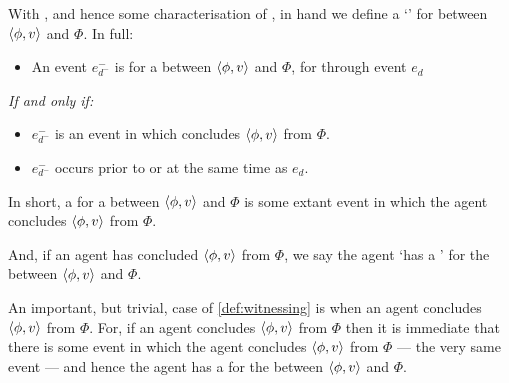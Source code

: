 \begin{note}
  With \supportI{}, and hence some characterisation of \ros{}, in hand we define a `' for \ros{} between \(\langle \phi, v \rangle\) and \(\Phi\).
  In full:

  \begin{definition}%
    \label{def:witnessing}%
    \vspace{-\baselineskip}
    \begin{itemize}
    \item
      An event \(e^{-}_{d^{-}}\) is \emph{} for a \ros{} between \(\langle \phi, v \rangle\) and \(\Phi\), for \vAgent{} through event \(e_{d}\)
    \end{itemize}

    \emph{If and only if:}

    \begin{itemize}
    \item
      \(e^{-}_{d^{-}}\) is an event in which \vAgent{} concludes \(\langle \phi, v \rangle\) from \(\Phi\).
    \item
      \(e^{-}_{d^{-}}\) occurs prior to or at the same time as \(e_{d}\).
    \end{itemize}
    \vspace{-\baselineskip}
  \end{definition}

  \noindent%
  In short, a \wit{} for a \ros{} between \(\langle \phi, v \rangle\) and \(\Phi\) is some extant event in which the agent concludes \(\langle \phi, v \rangle\) from \(\Phi\).

  And, if an agent has concluded \(\langle \phi, v \rangle\) from \(\Phi\), we say the agent `has a \wit{}' for the \ros{} between \(\langle \phi, v \rangle\) and \(\Phi\).
\end{note}


\begin{note}
  An important, but trivial, case of \autoref{def:witnessing} is when an agent concludes \(\langle \phi, v \rangle\) from \(\Phi\).
  For, if an agent concludes \(\langle \phi, v \rangle\) from \(\Phi\) then it is immediate that there is some event in which the agent concludes \(\langle \phi, v \rangle\) from \(\Phi\) --- the very same event --- and hence the agent has a \wit{} for the \ros{} between \(\langle \phi, v \rangle\) and \(\Phi\).
\end{note}


